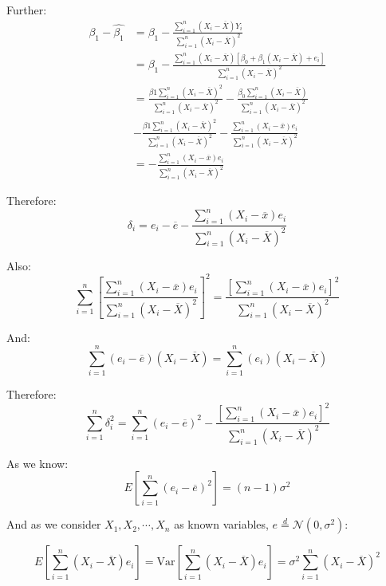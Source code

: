 \documentclass{article}
\newcommand{\Var}{\mathrm{Var}}
\begin{document}
Further:
\begin{equation}
    \begin{split}
    \beta_1-\hat{\beta_1}&=\beta_1-\frac{\sum_{i=1}^n(X_i-\overline{X})Y_i}{\sum_{i=1}^n(X_i-\overline{X})^2}\\
    &=\beta_1-\frac{\sum_{i=1}^n(X_i-\overline{X})[\beta_0+\beta_1(X_i-\overline{X})+e_i]}{\sum_{i=1}^n(X_i-\overline{X})^2}\\
    &=\frac{\beta{1}\sum_{i=1}^n(X_i-\overline{X})^2}{\sum_{i=1}^n(X_i-\overline{X})^2}-\frac{\beta_0\sum_{i=1}^n(X_i-\overline{X})}{\sum_{i=1}^n(X_i-\overline{X})^2}\\
    &-\frac{\beta{1}\sum_{i=1}^n(X_i-\overline{X})^2}{\sum_{i=1}^n(X_i-\overline{X})^2}-\frac{\sum_{i=1}^n(X_i-\overline{x})e_i}{\sum_{i=1}^n(X_i-\overline{X})^2}\\
    &=-\frac{\sum_{i=1}^n(X_i-\overline{x})e_i}{\sum_{i=1}^n(X_i-\overline{X})^2}
    \end{split}
\end{equation}

Therefore:
\begin{equation}
\delta_i=e_i-\overline{e}-\frac{\sum_{i=1}^n(X_i-\overline{x})e_i}{\sum_{i=1}^n(X_i-\overline{X})^2}
\end{equation}

Also:
\begin{equation}
\sum_{i=1}^n[\frac{\sum_{i=1}^n(X_i-\overline{x})e_i}{\sum_{i=1}^n(X_i-\overline{X})^2}]^2=
\frac{[\sum_{i=1}^n(X_i-\overline{x})e_i]^2}{\sum_{i=1}^n(X_i-\overline{X})^2}
\end{equation}

And:
\begin{equation}
\sum_{i=1}^n(e_i-\overline{e})(X_i-\overline{X})=\sum_{i=1}^n(e_i)(X_i-\overline{X})
\end{equation}

Therefore:
\begin{equation}
\sum_{i=1}^n\delta_i^2=\sum_{i=1}^n(e_i-\overline{e})^2-\frac{[\sum_{i=1}^n(X_i-\overline{x})e_i]^2}{\sum_{i=1}^n(X_i-\overline{X})^2}
\end{equation}

As we know:
\begin{equation}
E[\sum_{i=1}^n(e_i-\overline{e})^2]=(n-1)\sigma^2
\end{equation}

And as we consider $X_1, X_2, \cdots, X_n$ as known variables, \(e\stackrel{d}{=}\mathcal{N}(0, \sigma^2)\):

\begin{equation}
E[\sum_{i=1}^n(X_i-\overline{X})e_i]=\Var{[\sum_{i=1}^n(X_i-\overline{X})e_i]}=\sigma^2\sum_{i=1}^n(X_i-\overline{X})^2
\end{equation}
\end{document}

